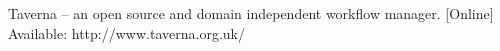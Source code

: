 \renewcommand{\bibname}{References}
\begin{thebibliography}{99}
 Taverna -- an open source and domain independent workflow manager. [Online] Available: http://www.taverna.org.uk/
\end{thebibliography}

%    
%    
